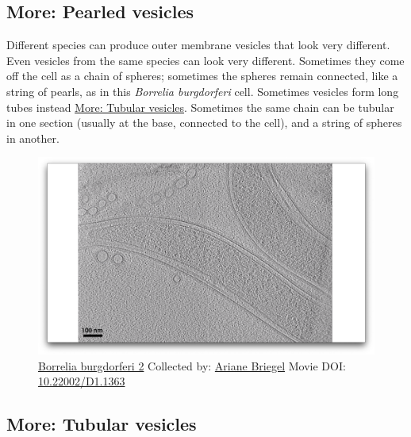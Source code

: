 \documentclass[]{tufte-book}
\begin{document}
\hypertarget{Pearled_vesicles}{\subsection*{More: Pearled
vesicles}\label{Pearled_vesicles}}

Different species can produce outer membrane vesicles that look very
different. Even vesicles from the same species can look very different.
Sometimes they come off the cell as a chain of spheres; sometimes the
spheres remain connected, like a string of pearls, as in this
\emph{Borrelia burgdorferi} cell. Sometimes vesicles form long tubes
instead \protect\hyperlink{Tubular_vesicles}{More: Tubular vesicles}.
Sometimes the same chain can be tubular in one section (usually at the
base, connected to the cell), and a string of spheres in another.





\begin{figure}
\includegraphics{movie_stills/2_4a} \caption[\protect\hyperlink{tree}{Borrelia burgdorferi 2} Collected
by: \protect\hyperlink{ariane_briegel}{Ariane Briegel} Movie DOI:
\href{https://doi.org/10.22002/D1.1363}{10.22002/D1.1363}]{\protect\hyperlink{tree}{Borrelia burgdorferi 2} Collected
by: \protect\hyperlink{ariane_briegel}{Ariane Briegel} Movie DOI:
\href{https://doi.org/10.22002/D1.1363}{10.22002/D1.1363}}\label{fig:2-4a}
\end{figure}

\hypertarget{Tubular_vesicles}{\subsection*{More: Tubular
vesicles}\label{Tubular_vesicles}}
\end{document}
